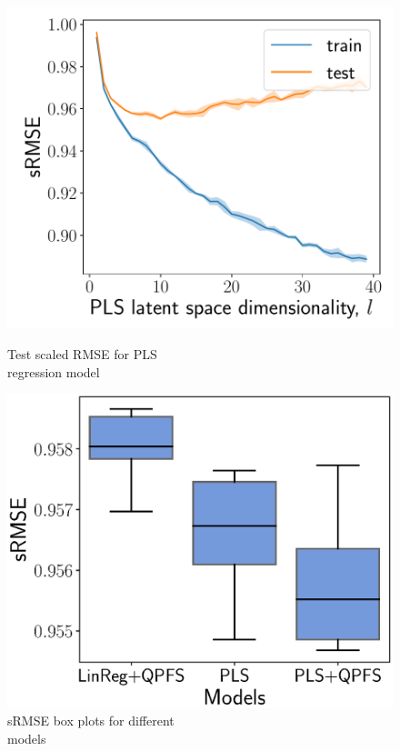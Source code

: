 \documentclass[12pt,twoside]{article}
\theoremstyle{definition}
\begin{document}
\begin{figure}[h]
	\begin{minipage}{.5\linewidth}
		\centering
		\includegraphics[width=1.\linewidth]{figs/pls_vs_k}
		\caption{Test scaled RMSE for PLS \\regression model}
		\label{fig:pls_vs_k}
	\end{minipage}%
	\begin{minipage}{.5\linewidth}
		\centering
		\includegraphics[width=1.\linewidth]{figs/models}
		\caption{sRMSE box plots for different \\models}
		\label{fig:models}
	\end{minipage}
\end{figure}
\end{document}
